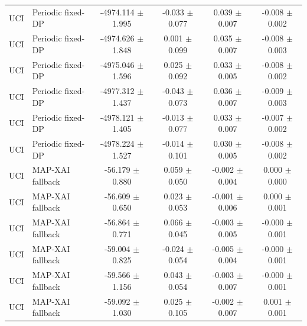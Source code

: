 \begin{table}[t]
\begin{tabular}{llcccc}
UCI & Periodic fixed-DP & -4974.114 $\pm$ 1.995 & -0.033 $\pm$ 0.077 & 0.039 $\pm$ 0.007 & -0.008 $\pm$ 0.002 \\
UCI & Periodic fixed-DP & -4974.626 $\pm$ 1.848 & 0.001 $\pm$ 0.099 & 0.035 $\pm$ 0.007 & -0.008 $\pm$ 0.003 \\
UCI & Periodic fixed-DP & -4975.046 $\pm$ 1.596 & 0.025 $\pm$ 0.092 & 0.033 $\pm$ 0.005 & -0.008 $\pm$ 0.002 \\
UCI & Periodic fixed-DP & -4977.312 $\pm$ 1.437 & -0.043 $\pm$ 0.073 & 0.036 $\pm$ 0.007 & -0.009 $\pm$ 0.003 \\
UCI & Periodic fixed-DP & -4978.121 $\pm$ 1.405 & -0.013 $\pm$ 0.077 & 0.033 $\pm$ 0.007 & -0.007 $\pm$ 0.002 \\
UCI & Periodic fixed-DP & -4978.224 $\pm$ 1.527 & -0.014 $\pm$ 0.101 & 0.030 $\pm$ 0.005 & -0.008 $\pm$ 0.002 \\
UCI & MAP-XAI fallback & -56.179 $\pm$ 0.880 & 0.059 $\pm$ 0.050 & -0.002 $\pm$ 0.004 & 0.000 $\pm$ 0.000 \\
UCI & MAP-XAI fallback & -56.609 $\pm$ 0.650 & 0.023 $\pm$ 0.053 & -0.001 $\pm$ 0.006 & 0.000 $\pm$ 0.001 \\
UCI & MAP-XAI fallback & -56.864 $\pm$ 0.771 & 0.066 $\pm$ 0.045 & -0.003 $\pm$ 0.005 & -0.000 $\pm$ 0.001 \\
UCI & MAP-XAI fallback & -59.004 $\pm$ 0.825 & -0.024 $\pm$ 0.054 & -0.005 $\pm$ 0.004 & -0.000 $\pm$ 0.001 \\
UCI & MAP-XAI fallback & -59.566 $\pm$ 1.156 & 0.043 $\pm$ 0.054 & -0.003 $\pm$ 0.007 & -0.000 $\pm$ 0.001 \\
UCI & MAP-XAI fallback & -59.092 $\pm$ 1.030 & 0.025 $\pm$ 0.105 & -0.002 $\pm$ 0.007 & 0.001 $\pm$ 0.001 \\
\bottomrule
\end{tabular}
\end{table}
